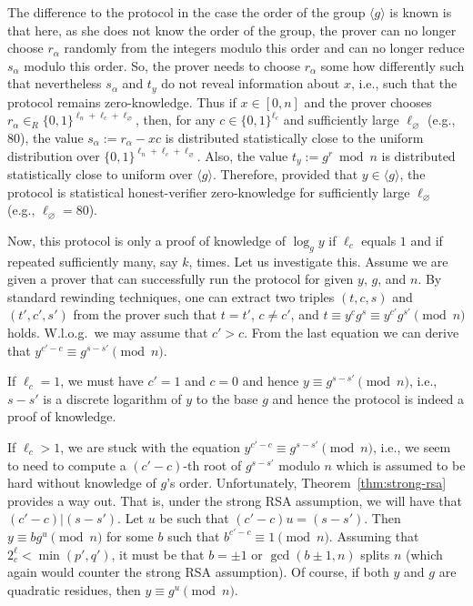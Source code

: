 The difference to the protocol in the case the order of the group $\langle g \rangle$ 
is known is
that here, as she does not know the order of the group,
the prover can no longer choose $r_\alpha$ randomly from the integers modulo this 
order and can no longer reduce $s_\alpha$ modulo this order.
So, the prover needs to choose $r_\alpha$ some how differently
such that nevertheless $s_\alpha$ and $t_y$ 
do not reveal information about $x$, i.e., such that
the protocol remains zero-knowledge.
Thus if $x  \in [0,n]$ and the prover chooses $r_\alpha \in_R \{0,1\}^{\ell_n+\ell_c + \ell_\varnothing}$,
then, for any  $c \in \{0,1\}^{\ell_c}$ and sufficiently large $\ell_\varnothing$ (e.g., 80), 
the value $s_\alpha := r_\alpha - xc$ is 
distributed statistically close to the uniform distribution 
over $\{0,1\}^{\ell_n+\ell_c + \ell_\varnothing}$.
Also, the value $t_y := g^r \bmod{n}$ is distributed statistically close to uniform 
over $\langle g \rangle$.
Therefore, provided that $y \in  \langle g \rangle$, the protocol is  statistical honest-verifier zero-knowledge 
for sufficiently large $\ell_\varnothing$ (e.g., $\ell_\varnothing = 80 $).



Now, this protocol is only a proof of knowledge of $\log_g y$ if $\ell_c$ equals
$1$ and if repeated sufficiently many, say $k$, times.
Let us investigate this.
Assume we are given a prover that can successfully run the protocol for given
$y$, $g$, and $n$.
By standard rewinding techniques, one can extract two triples
$(t,c,s)$ and $(t',c',s')$ from the prover such that 
$t=t'$, $c \neq c'$, and $t \equiv y^c g^s  \equiv y^{c'} g^{s'} \pmod{n}$
holds. 
W.l.o.g.\ we may assume that $c'>c$.
From the last equation we can derive that
$y^{c'-c} \equiv g^{s-s'} \pmod{n}$.

If $\ell_c =1$, we must have $c' = 1$ and $c=0$ and
hence $y \equiv g^{s-s'} \pmod{n}$, i.e., $s-s'$ is a discrete logarithm
of $y$ to the base $g$ and hence the protocol is indeed a proof of knowledge.

If  $\ell_c > 1 $, we are stuck with the equation $y^{c'-c} \equiv g^{s-s'} \pmod{n}$, i.e., we seem to need to compute a $(c'-c)$-th root of  $g^{s-s'}$ modulo $n$ which 
is assumed to be hard without knowledge of $g$'s order.
Unfortunately,  Theorem~\ref{thm:strong-rsa} provides a way out.
That is, under the strong RSA assumption, we will have that 
$(c'-c) | (s-s')$. 
Let $u$ be such that $(c'-c) u = (s-s')$.
Then $y \equiv b g^u \pmod{n}$ for some 
$b$ such that $b^{c'-c} \equiv 1 \pmod{n}$.
Assuming that $2^\ell_c < \min(p',q')$, it must be 
that $b = \pm 1$ or  $\gcd(b \pm 1,n)$ splits $n$ (which again would counter
the strong RSA assumption).
Of course, if both $y$ and $g$ are quadratic residues, then
$y \equiv g^u \pmod{n}$. 

